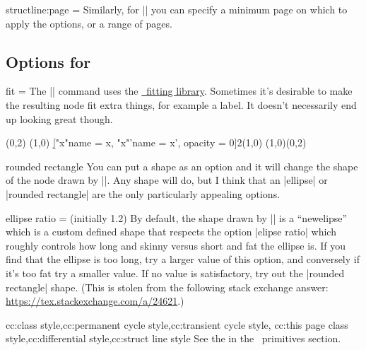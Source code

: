 \begin{sseqdata}[name = basic, cohomological Serre grading]
\begin{key}{structline:page = }
Similarly, for |\structlineoptions| you can specify a minimum page on which to
apply the options, or a range of pages.
\end{key}

\subsection{Options for \sectionstring\circleclass}
\begin{key}{fit = }%
The |\circleclasses| command uses the \href{\pgfmanualurl#section.52}{\tikzpkg\
fitting library}. Sometimes it's desirable to make the resulting node fit extra
things, for example a label. It doesn't necessarily end up looking great though.
\begin{codeexample}[]
\begin{sseqpage}[ Adams grading, axes gap = 0.7cm ]
\class(0,2)
\class(1,0)
\d["x"{name = x}, "x"'{name = x', opacity = 0}]2(1,0)
\circleclasses[fit = (x)(x'), rounded rectangle](1,0)(0,2)
\end{sseqpage}
\end{codeexample}
\end{key}

\begin{key}{rounded rectangle}
You can put a shape as an option and it will change the shape of the node drawn
by |\circleclasses|. Any shape will do, but I think that an |ellipse| or
|rounded rectangle| are the only particularly appealing options.
\end{key}

\begin{key}{ellipse ratio =  (initially 1.2)}%
By default, the shape drawn by |\circleclasses| is a ``newelipse'' which is a
custom defined shape that respects the option |elipse ratio| which roughly
controls how long and skinny versus short and fat the ellipse is. If you find
that the ellipse is too long, try a larger value of this option, and conversely
if it's too fat try a smaller value. If no value is satisfactory, try out the
|rounded rectangle| shape. (This is stolen from the following stack exchange
answer: \url{https://tex.stackexchange.com/a/24621}.)
\end{key}

\begin{keylist}{
    cc:class style,cc:permanent cycle style,cc:transient cycle style,
    cc:this page class style,cc:differential style,cc:struct line style
}
See the  in the \tikzpkg\
primitives section.
\end{keylist}


\end{sseqdata}
